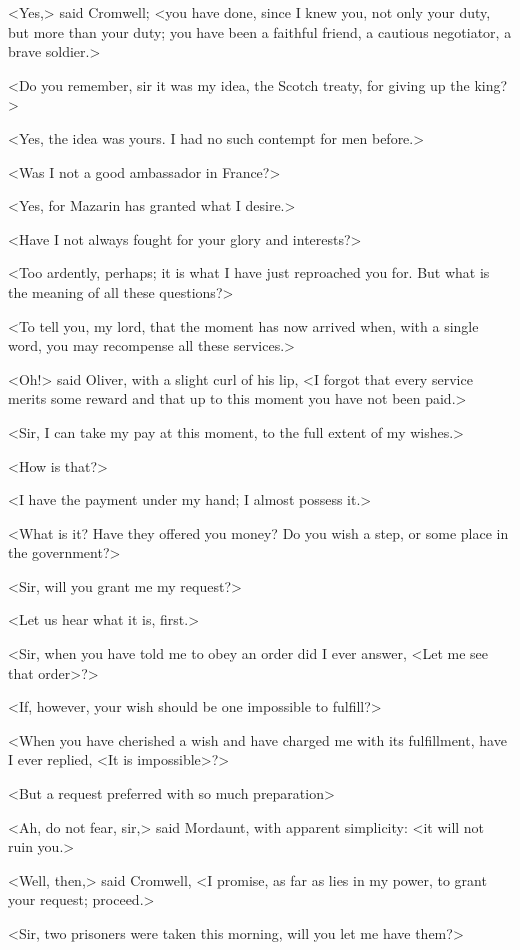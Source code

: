 <Yes,> said Cromwell; <you have done, since I knew you, not only your duty, but more than your duty; you have been a faithful friend, a cautious negotiator, a brave soldier.>

<Do you remember, sir it was my idea, the Scotch treaty, for giving up the king?>

<Yes, the idea was yours. I had no such contempt for men before.>

<Was I not a good ambassador in France?>

<Yes, for Mazarin has granted what I desire.>

<Have I not always fought for your glory and interests?>

<Too ardently, perhaps; it is what I have just reproached you for. But what is the meaning of all these questions?>

<To tell you, my lord, that the moment has now arrived when, with a single word, you may recompense all these services.>

<Oh!> said Oliver, with a slight curl of his lip, <I forgot that every service merits some reward and that up to this moment you have not been paid.>

<Sir, I can take my pay at this moment, to the full extent of my wishes.>

<How is that?>

<I have the payment under my hand; I almost possess it.>

<What is it? Have they offered you money? Do you wish a step, or some place in the government?>

<Sir, will you grant me my request?>

<Let us hear what it is, first.>

<Sir, when you have told me to obey an order did I ever answer, <Let me see that order>?>

<If, however, your wish should be one impossible to fulfill?>

<When you have cherished a wish and have charged me with its fulfillment, have I ever replied, <It is impossible>?>

<But a request preferred with so much preparation\longdash>

<Ah, do not fear, sir,> said Mordaunt, with apparent simplicity: <it will not ruin you.>

<Well, then,> said Cromwell, <I promise, as far as lies in my power, to grant your request; proceed.>

<Sir, two prisoners were taken this morning, will you let me have them?>

